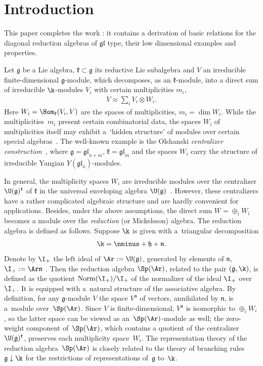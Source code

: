 \documentclass[pdftex]{sigma}
\def\f{\mathfrak{k}}\def\h{\mathfrak{h}}\def\hs{\mathring{z}}\def\g{\mathfrak{g}}\def\sl{\mathfrak{sl}}\def\gl{\mathfrak{gl}}
\def\nplus{\mathfrak{n}}\def\nn{\nonumber}\def\nin{\noindent}
\numberwithin{equation}{section}
\begin{document}
\section{Introduction}

This paper completes the work \cite{KO3}: it contains a derivation of basic relations for the diagonal reduction algebras of $\gl$ type, their
low dimensional examples and properties.

Let $\g$ be a Lie algebra, $\f\subset \g$ its reductive Lie subalgebra and $V$ an irreducible f\/inite-dimensional $\g$-module,
which decomposes, as an $\f$-module, into a direct sum of irreducible $\k$-modules $V_i$ with certain multi\-plicities $m_i$,
\begin{gather}
 \label{intro0}V\approx \sum_iV_i\otimes W_i .
\end{gather}
Here  $W_i=\Hom_\f(V_i,V)$ are the spaces of multiplicities, $m_i=\dim W_i$. While the multiplici\-ties~$m_i$ present certain combinatorial data, the spaces
$W_i$ of multiplicities itself may exhibit a~`hidden structure'  of modules over certain special algebras~\cite{C}. The well-known example is the Olshanski
\textit{centralizer construction}~\cite{Ol}, where  $\g=\gl_{n+m}$, $\f=\gl_m$ and the spaces $W_i$ carry the structure of irreducible Yangian $Y(\gl_n)$-modules.

In general, the multiplicity spaces $W_i$ are irreducible modules over the centralizer $\U(\g)^\f$ of $\f$ in the universal enveloping algebra
$\U(\g)$~\cite{LM}. However, these centralizers have a rather complicated algebraic structure and are hardly convenient for applications. Besides, under
the above assumptions, the direct sum $W=\oplus_i W_i$ becomes  a module over the {\it reduction} (or Mickelsson) algebra. The reduction algebra is def\/ined
as follows. Suppose $\k$ is given with  a~triangular decomposition
\begin{gather}
\label{intro1} \k=\nminus+\h+\nplus  .
\end{gather}
Denote by $\I_+$ the left ideal of $\Ar :=\U(\g)$, generated by elements of $\nplus$, $\I_+ :=\Ar\nplus$ . Then the reduction algebra $\Sp(\Ar)$, related to the pair
$(\g,\k)$, is def\/ined as the quotient $\mathrm{Norm}(\I_+)/\I_+$ of the normalizer of the ideal $\I_+$ over $\I_+$. It is equipped with a~natural structure of the
associative algebra.  By def\/inition, for any $\g$-module $V$ the space $V^\nplus$ of vectors, annihilated by $\nplus$, is a~module over~$\Sp(\Ar)$. Since $V$ is
f\/inite-dimensional, $V^\nplus$ is isomorphic to $\oplus_iW_i$, so the latter space can be viewed as an~$\Sp(\Ar)$-module as well; the zero-weight component of~$\Sp(\Ar)$, which contains a quotient of the centralizer~$\U(\g)^\f$, preserves each multiplicity space~$W_i$. The representation theory of the reduction
algebra~$\Sp(\Ar)$ is closely related to the theory of branching rules $\g\downarrow \k$ for the restrictions of representations of~$\g$ to~$\k$.
\end{document}
